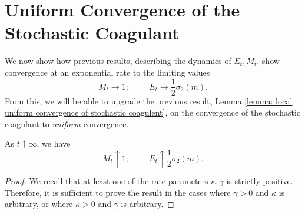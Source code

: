 \section{Uniform Convergence of the Stochastic Coagulant} We now show how previous results, describing the dynamics of $E_t, M_t$, show convergence at an exponential rate to the limiting values \begin{equation} M_t\rightarrow 1;\hspace{1cm} E_t\rightarrow \frac{1}{2}\sigma_2(m). \end{equation}  From this, we will be able to upgrade the previous result, Lemma \ref{lemma: local uniform convergence of stochastic coagulent}, on the convergence of the stochastic coagulant to \emph{uniform} convergence. \begin{lemma}\label{lemma: M and E at infinity} As $t\uparrow \infty$, we have \begin{equation}
    M_t\uparrow 1; \hspace{1cm}E_t\uparrow  \frac{1}{2}\sigma_2(m).
\end{equation} \end{lemma} \begin{proof} We recall that at least one of the rate parameters $\kappa, \gamma$ is strictly positive. Therefore, it is sufficient to prove the result in the cases where $\gamma>0$ and $\kappa$ is arbitrary, or where $\kappa>0$ and $\gamma$ is arbitrary.

\end{proof}
